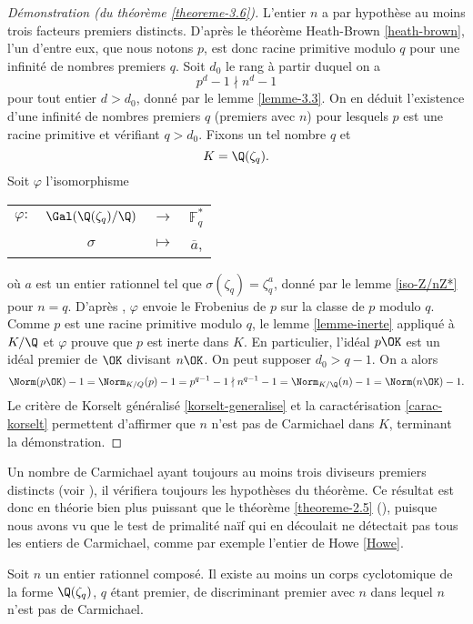 \begin{proof}[Démonstration (du théorème \ref{theoreme-3.6})]
	L'entier $n$ a par hypothèse au moins trois facteurs premiers distincts. D'après le théorème Heath-Brown \ref{heath-brown}, l'un d'entre eux, que nous notons $p$, est donc racine primitive modulo $q$ pour une infinité de nombres premiers $q$. Soit $d_0$ le rang à partir duquel on a \[p^d - 1 \nmid n^d - 1\] pour tout entier $d>d_0$, donné par le lemme \ref{lemme-3.3}. On en déduit l'existence d'une infinité de nombres premiers $q$ (premiers avec $n$) pour lesquels $p$ est une racine primitive et vérifiant $q>d_0$. Fixons un tel nombre $q$ et \[K = \Q(\zeta_q).\] Soit $\varphi$ l'isomorphisme
\begin{center}
	\begin{tabular}{cccc}
		$\varphi :$ & $\Gal(\Q(\zeta_q)/\Q)$ & $\longrightarrow$ & $\mathbb{F}_q^*$ \\
		&$\sigma$	& $\longmapsto$ & $\overline{a}$,
	\end{tabular}
\end{center}
	où $a$ est un entier rationnel tel que $\sigma(\zeta_q) = \zeta_q^a$, donné par le lemme \ref{iso-Z/nZ*} pour $n=q$. D'après \cite[p. 45 relation (23)]{Kraus}, $\varphi$ envoie le Frobenius de $p$ sur la classe de $p$ modulo $q$. Comme $p$ est une racine primitive modulo $q$, le lemme \ref{lemme-inerte} appliqué à $K/\Q$ et $\varphi$ prouve que $p$ est inerte dans $K$. En particulier, l'idéal $p\OK$ est un idéal premier de $\OK$ divisant $n\OK$. On peut supposer $d_0 > q-1$. On a alors \[ \Norm(p\OK) - 1 = \Norm_{K/Q}(p) - 1 = p^{q-1} - 1 \nmid n^{q-1} - 1 = \Norm_{K/\Q}(n) - 1 = \Norm(n\OK) - 1.\] Le critère de Korselt généralisé \ref{korselt-generalise} et la caractérisation \ref{carac-korselt} permettent d'affirmer que $n$ n'est pas de Carmichael dans $K$, terminant la démonstration.

\end{proof}

Un nombre de Carmichael ayant toujours au moins trois diviseurs premiers distincts (voir \cite[p. 90 prop. 3.35]{Demazure}), il vérifiera toujours les hypothèses du théorème. Ce résultat est donc en théorie bien plus puissant que le théorème \ref{theoreme-2.5} (\cite[th. 2.5]{article}), puisque nous avons vu que le test de primalité naïf qui en découlait ne détectait pas tous les entiers de Carmichael, comme par exemple l'entier de Howe \ref{Howe}. 

\begin{corollaire}\label{corollaire-3.7}
	Soit $n$ un entier rationnel composé. Il existe au moins un corps cyclotomique de la forme $\Q(\zeta_q)$, $q$ étant premier, de discriminant premier avec $n$ dans lequel $n$ n'est pas de Carmichael.
\end{corollaire}


